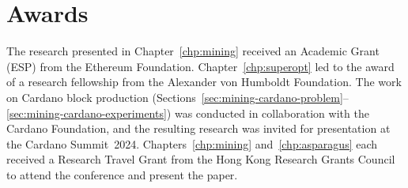 \section{Awards}
The research presented in Chapter~\ref{chp:mining} received an Academic Grant (ESP) from the Ethereum Foundation. Chapter~\ref{chp:superopt} led to the award of a research fellowship from the Alexander von Humboldt Foundation. The work on Cardano block production (Sections~\ref{sec:mining-cardano-problem}--\ref{sec:mining-cardano-experiments}) was conducted in collaboration with the Cardano Foundation, and the resulting research was invited for presentation at the Cardano Summit~2024.
Chapters~\ref{chp:mining} and~\ref{chp:asparagus} each received a Research Travel Grant from the Hong Kong Research Grants Council to attend the conference and present the paper.